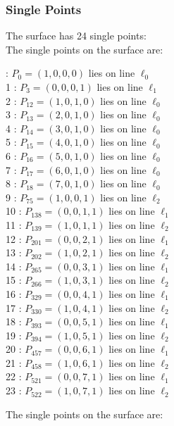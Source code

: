 \documentclass{article}
\begin{document}
{\subsubsection*{Single Points}
The surface has 24 single points:\\
The single points on the surface are:\\
\begin{multicols}{2}
 : $P_{0}=( 1, 0, 0, 0 )$ lies on line $\ell_{0}$\\
1 : $P_{3}=( 0, 0, 0, 1 )$ lies on line $\ell_{1}$\\
2 : $P_{12}=( 1, 0, 1, 0 )$ lies on line $\ell_{0}$\\
3 : $P_{13}=( 2, 0, 1, 0 )$ lies on line $\ell_{0}$\\
4 : $P_{14}=( 3, 0, 1, 0 )$ lies on line $\ell_{0}$\\
5 : $P_{15}=( 4, 0, 1, 0 )$ lies on line $\ell_{0}$\\
6 : $P_{16}=( 5, 0, 1, 0 )$ lies on line $\ell_{0}$\\
7 : $P_{17}=( 6, 0, 1, 0 )$ lies on line $\ell_{0}$\\
8 : $P_{18}=( 7, 0, 1, 0 )$ lies on line $\ell_{0}$\\
9 : $P_{75}=( 1, 0, 0, 1 )$ lies on line $\ell_{2}$\\
10 : $P_{138}=( 0, 0, 1, 1 )$ lies on line $\ell_{1}$\\
11 : $P_{139}=( 1, 0, 1, 1 )$ lies on line $\ell_{2}$\\
12 : $P_{201}=( 0, 0, 2, 1 )$ lies on line $\ell_{1}$\\
13 : $P_{202}=( 1, 0, 2, 1 )$ lies on line $\ell_{2}$\\
14 : $P_{265}=( 0, 0, 3, 1 )$ lies on line $\ell_{1}$\\
15 : $P_{266}=( 1, 0, 3, 1 )$ lies on line $\ell_{2}$\\
16 : $P_{329}=( 0, 0, 4, 1 )$ lies on line $\ell_{1}$\\
17 : $P_{330}=( 1, 0, 4, 1 )$ lies on line $\ell_{2}$\\
18 : $P_{393}=( 0, 0, 5, 1 )$ lies on line $\ell_{1}$\\
19 : $P_{394}=( 1, 0, 5, 1 )$ lies on line $\ell_{2}$\\
20 : $P_{457}=( 0, 0, 6, 1 )$ lies on line $\ell_{1}$\\
21 : $P_{458}=( 1, 0, 6, 1 )$ lies on line $\ell_{2}$\\
22 : $P_{521}=( 0, 0, 7, 1 )$ lies on line $\ell_{1}$\\
23 : $P_{522}=( 1, 0, 7, 1 )$ lies on line $\ell_{2}$\\
\end{multicols}
The single points on the surface are:\\
}
\end{document}
